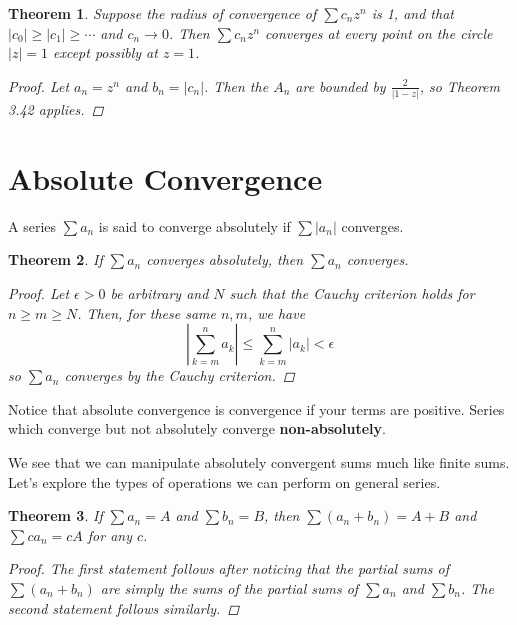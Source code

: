 \documentclass{scrbook}
\renewcommand{\to}{\rightarrow}
\newtheorem{theorem}{Theorem}
\begin{document}
\begin{theorem} %
Suppose the radius of convergence of $\sum c_nz^n$ is 1, and that $|c_0| \ge |c_1| \ge \dotsb$ and $c_n \to 0$. Then $\sum c_nz^n$ converges at every point on the circle $|z| = 1$ except possibly at $z = 1$.

\begin{proof}
Let $a_n = z^n$ and $b_n = |c_n|$. Then the $A_n$ are bounded by $\frac{2}{|1 - z|}$, so Theorem 3.42 applies.
\end{proof}
\end{theorem}

\section{Absolute Convergence}

A series $\sum a_n$ is said to converge absolutely if $\sum |a_n|$ converges.

\begin{theorem} %
If $\sum a_n$ converges absolutely, then $\sum a_n$ converges.

\begin{proof}
Let $\epsilon > 0$ be arbitrary and $N$ such that the Cauchy criterion holds for $n \ge m \ge N$. Then, for these same $n, m$, we have
\[
	\left| \sum_{k=m}^{n} a_k \right| \le \sum_{k=m}^{n} |a_k| < \epsilon
\]
so $\sum a_n$ converges by the Cauchy criterion.
\end{proof}
\end{theorem}

Notice that absolute convergence is convergence if your terms are positive. Series which converge but not absolutely converge \textbf{non-absolutely}.

We see that we can manipulate absolutely convergent sums much like finite sums. Let's explore the types of operations we can perform on general series.

\begin{theorem} %
If $\sum a_n = A$ and $\sum b_n = B$, then $\sum (a_n + b_n) = A + B$ and $\sum ca_n = cA$ for any $c$.

\begin{proof}
The first statement follows after noticing that the partial sums of $\sum (a_n + b_n)$ are simply the sums of the partial sums of $\sum a_n$ and $\sum b_n$. The second statement follows similarly.
\end{proof}
\end{theorem}
\end{document}
